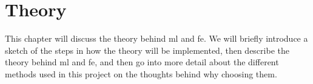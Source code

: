 \chapter{Theory}\label{cha:theory}
This chapter will discuss the theory behind \gls{ml} and \gls{fe}. We will briefly introduce a sketch of the steps in how the theory will be implemented, then describe the theory behind \gls{ml} and \gls{fe}, and then go into more detail about the different methods used in this project on the thoughts behind why choosing them.










